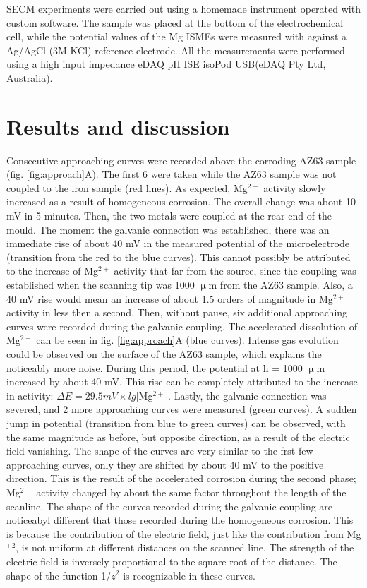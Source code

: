 \documentclass[3p]{elsarticle}
\begin{document}
SECM experiments were carried out using a homemade instrument operated with custom software. The sample was placed at the bottom of the electrochemical cell, while the potential values of the Mg ISMEs were measured with against a Ag/AgCl (3M KCl) reference electrode. All the measurements were performed using a high input impedance eDAQ pH ISE isoPod USB(eDAQ Pty Ltd, Australia).

\section{Results and discussion}

Consecutive approaching curves were recorded above the corroding AZ63 sample (fig. \ref{fig:approach}A). The first 6 were taken while the AZ63 sample was not coupled to the iron sample (red lines). As expected, Mg$^{2+}$ activity slowly increased as a result of homogeneous corrosion. The overall change was about 10 mV in 5 minutes. Then, the two metals were coupled at the rear end of the mould. The moment the galvanic connection was established, there was an immediate rise of about 40 mV in the measured potential of the microelectrode (transition from the red to the blue curves). This cannot possibly be attributed to the increase of Mg$^{2+}$ activity that far from the source, since the coupling was established when the scanning tip was 1000 $\upmu$m from the AZ63 sample. Also, a 40 mV rise would mean an increase of about 1.5 orders of magnitude in Mg$^{2+}$ activity in less then a second. Then, without pause, six additional approaching curves were recorded during the galvanic coupling. The accelerated dissolution of Mg$^{2+}$ can be seen in fig. \ref{fig:approach}A (blue curves). Intense gas evolution could be observed on the surface of the AZ63 sample, which explains the noticeably more noise. During this period, the potential at h = 1000 $\upmu$m increased by about 40 mV. This rise can be completely attributed to the increase in activity: $\Delta E = 29.5 mV \times lg[$Mg$^{2+}]$. Lastly, the galvanic connection was severed, and 2 more approaching curves were measured (green curves). A sudden jump in potential (transition from blue to green curves) can be observed, with the same magnitude as before, but opposite direction, as a result of the electric field vanishing. The shape of the curves are very similar to the frst few approaching curves, only they are shifted by about 40 mV to the positive direction. This is the result of the accelerated corrosion during the second phase; Mg$^{2+}$ activity changed by about the same factor throughout the length of the scanline. The shape of the curves recorded during the galvanic coupling are noticeabyl different that those recorded during the homogeneous corrosion. This is because the contribution of the electric field, just like the contribution from Mg$^{+2}$, is not uniform at different distances on the scanned line. The strength of the electric field is inversely proportional to the square root of the distance. The shape of the function 1/$z^2$ is recognizable in these curves.
\end{document}
